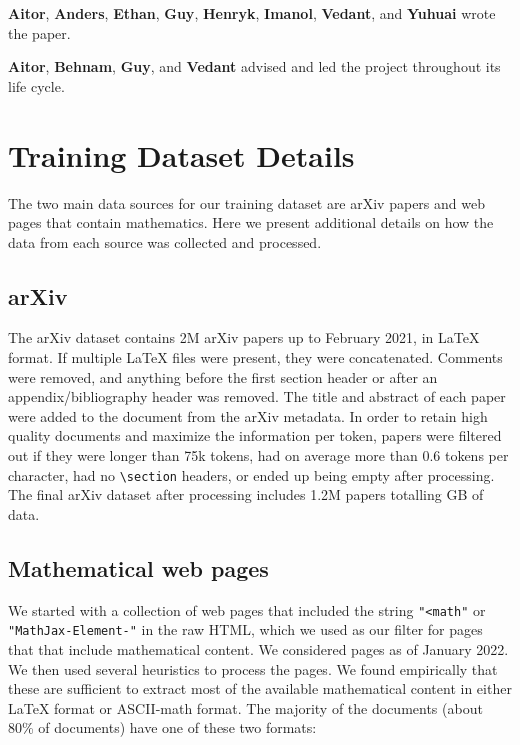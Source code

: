 \documentclass{article}
\begin{document}
\textbf{Aitor}, \textbf{Anders}, \textbf{Ethan}, \textbf{Guy}, \textbf{Henryk}, \textbf{Imanol}, \textbf{Vedant}, and \textbf{Yuhuai} wrote the paper.

\textbf{Aitor}, \textbf{Behnam}, \textbf{Guy}, and \textbf{Vedant} advised and led the project throughout its life cycle.


\section{Training Dataset Details}
\label{appendix:pretraining data}
\newcommand{\code}[1]{\texttt{#1}}

The two main data sources for our training dataset are arXiv papers and web pages that contain mathematics. Here we present additional details on how the data from each source was collected and processed.

\subsection{arXiv}

The arXiv dataset contains 2M arXiv papers up to February 2021, in \LaTeX{} format. If multiple \LaTeX{} files were present, they were concatenated. Comments were removed, and anything before the first section header or after an appendix/bibliography header was removed. The title and abstract of each paper were added to the document from the arXiv metadata. In order to retain high quality documents and maximize the information per token, papers were filtered out if they were longer than 75k tokens, had on average more than 0.6 tokens per character, had no \code{\textbackslash section} headers, or ended up being empty after processing. The final arXiv dataset after processing includes 1.2M papers totalling GB of data.

\subsection{Mathematical web pages}

We started with a collection of web pages that included the string \code{"<math"} or \code{"MathJax-Element-"} in the raw HTML, which we used as our filter for pages that that include mathematical content. We considered pages as of January 2022. We then used several heuristics to process the pages. We found empirically that these are sufficient to extract most of the available mathematical content in either \LaTeX{} format or ASCII-math format. The majority of the documents (about 80\% of documents) have one of these two formats:
\end{document}
